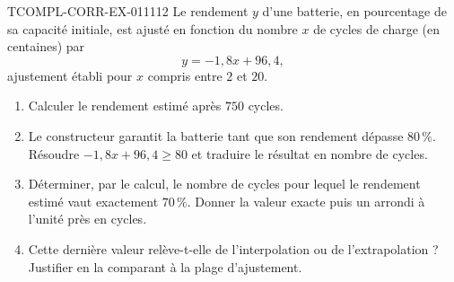 \begin{exercice}{TCOMPL-CORR-EX-011}{1}{12}
Le rendement $y$ d'une batterie, en pourcentage de sa capacité initiale, est
ajusté en fonction du nombre $x$ de cycles de charge (en centaines) par
\[
  y=-1{,}8x+96{,}4,
\]
ajustement établi pour $x$ compris entre $2$ et $20$.
\begin{enumerate}
  \item Calculer le rendement estimé après $750$ cycles.
  \item Le constructeur garantit la batterie tant que son rendement dépasse
    $80\,\%$. Résoudre $-1{,}8x+96{,}4\geqslant 80$ et traduire le résultat en
    nombre de cycles.
  \item Déterminer, par le calcul, le nombre de cycles pour lequel le rendement
    estimé vaut exactement $70\,\%$. Donner la valeur exacte puis un arrondi à
    l'unité près en cycles.
  \item Cette dernière valeur relève-t-elle de l'interpolation ou de
    l'extrapolation ? Justifier en la comparant à la plage d'ajustement.
\end{enumerate}
\end{exercice}
